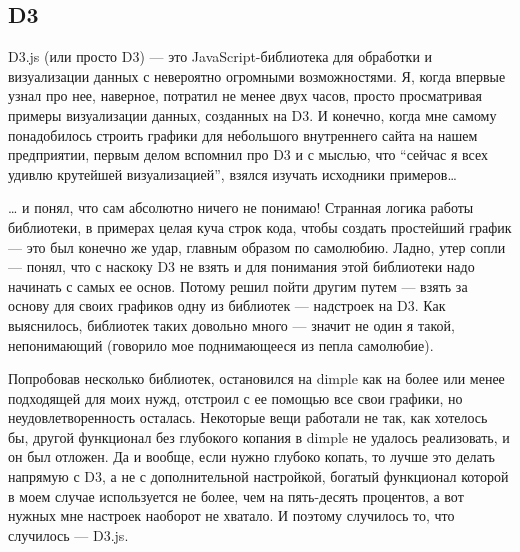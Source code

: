 \subsection{D3}

D3.js (или просто D3) — это JavaScript-библиотека для обработки и визуализации данных с невероятно огромными возможностями. Я, когда впервые узнал про нее, наверное, потратил не менее двух часов, просто просматривая примеры визуализации данных, созданных на D3. И конечно, когда мне самому понадобилось строить графики для небольшого внутреннего сайта на нашем предприятии, первым делом вспомнил про D3 и с мыслью, что “сейчас я всех удивлю крутейшей визуализацией”, взялся изучать исходники примеров…

… и понял, что сам абсолютно ничего не понимаю! Странная логика работы библиотеки, в примерах целая куча строк кода, чтобы создать простейший график — это был конечно же удар, главным образом по самолюбию. Ладно, утер сопли — понял, что с наскоку D3 не взять и для понимания этой библиотеки надо начинать с самых ее основ. Потому решил пойти другим путем — взять за основу для своих графиков одну из библиотек — надстроек на D3. Как выяснилось, библиотек таких довольно много — значит не один я такой, непонимающий (говорило мое поднимающееся из пепла самолюбие).

Попробовав несколько библиотек, остановился на dimple как на более или менее подходящей для моих нужд, отстроил с ее помощью все свои графики, но неудовлетворенность осталась. Некоторые вещи работали не так, как хотелось бы, другой функционал без глубокого копания в dimple не удалось реализовать, и он был отложен. Да и вообще, если нужно глубоко копать, то лучше это делать напрямую с D3, а не с дополнительной настройкой, богатый функционал которой в моем случае используется не более, чем на пять-десять процентов, а вот нужных мне настроек наоборот не хватало. И поэтому случилось то, что случилось — D3.js.